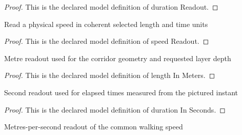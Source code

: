 \begin{proof}
  This is the declared model definition of duration Readout.
\end{proof}
\begin{definition}
  \label{def:physics:phyx-mini-0728:phyxminiproblems-problemphyxmini0728-speedreadout}
  Read a physical speed in coherent selected length and time units
\end{definition}
\begin{proof}
  This is the declared model definition of speed Readout.
\end{proof}
\begin{definition}
  \label{def:physics:phyx-mini-0728:phyxminiproblems-problemphyxmini0728-lengthinmeters}
  Metre readout used for the corridor geometry and requested layer depth
\end{definition}
\begin{proof}
  This is the declared model definition of length In Meters.
\end{proof}
\begin{definition}
  \label{def:physics:phyx-mini-0728:phyxminiproblems-problemphyxmini0728-durationinseconds}
  Second readout used for elapsed times measured from the pictured instant
\end{definition}
\begin{proof}
  This is the declared model definition of duration In Seconds.
\end{proof}
\begin{definition}
  \label{def:physics:phyx-mini-0728:phyxminiproblems-problemphyxmini0728-speedinmeterspersecond}
  Metres-per-second readout of the common walking speed
\end{definition}

